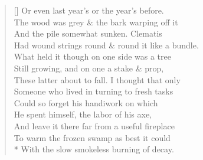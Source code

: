 \documentclass[MAIN]{subfiles}
\begin{document}
\begin{verse}[\versewidth]
Or even last year's or the year's before.\\
The wood was grey \& the bark warping off it\\
And the pile somewhat sunken. Clematis\\
Had wound strings round \& round it like a bundle.\\
What held it though on one side was a tree\\
Still growing, and on one a stake \& prop,\\
These latter about to fall. I thought that only\\
Someone who lived in turning to fresh tasks\\
Could so forget his handiwork on which\\
He spent himself, the labor of his axe,\\
And leave it there far from a useful fireplace\\
To warm the frozen swamp as best it could\\*
With the slow smokeless burning of decay.
\end{verse}
\end{document}
